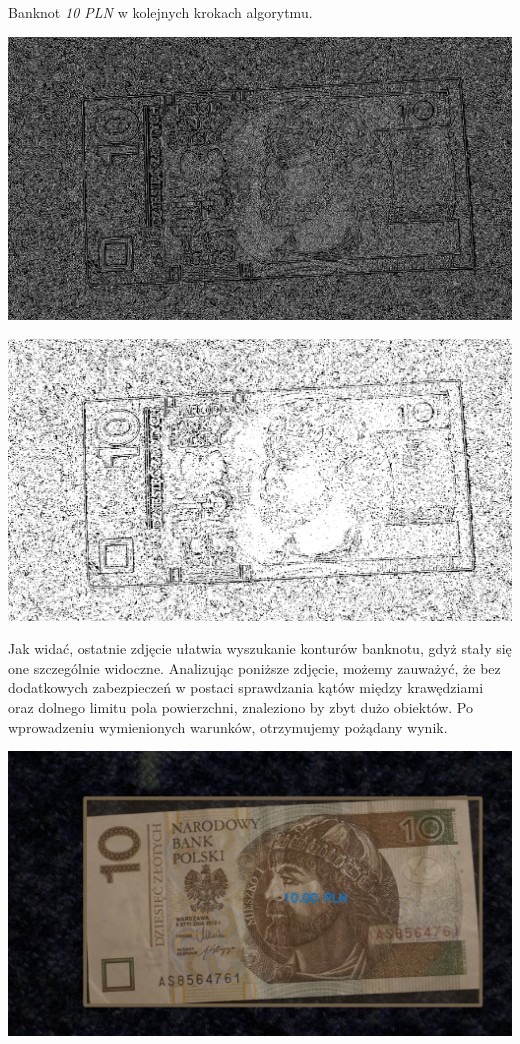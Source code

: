 \documentclass{mwart}
\begin{document}
Banknot \textit{10 PLN} w kolejnych krokach algorytmu.
\begin{center}
    \includegraphics[width=\textwidth]{Gray_10_before.png}
\end{center}

\begin{center}
    \includegraphics[width=\textwidth]{Gray_10_after.png}
\end{center}

Jak widać, ostatnie zdjęcie ułatwia wyszukanie konturów banknotu, gdyż stały się one szczególnie widoczne. Analizując poniższe zdjęcie, możemy zauważyć, że bez dodatkowych zabezpieczeń w postaci sprawdzania kątów między krawędziami oraz dolnego limitu pola powierzchni, znaleziono by zbyt dużo obiektów. Po wprowadzeniu wymienionych warunków, otrzymujemy pożądany wynik.

\begin{center}
    \includegraphics[width=\textwidth]{Single_10_PLN.png}
\end{center}
\end{document}

